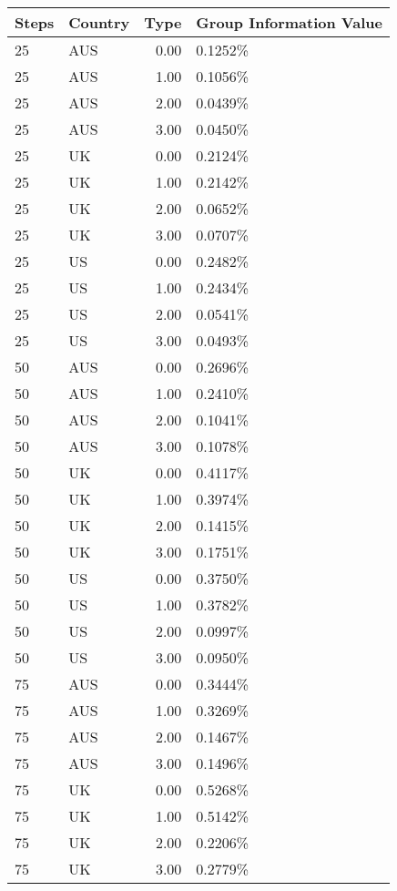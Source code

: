 \begin{table}[ht]
\centering
\begin{tabular}{llrl}
  \hline
Steps & Country & Type & Group Information Value \\ 
  \hline
25 & AUS & 0.00 & 0.1252\% \\ 
  25 & AUS & 1.00 & 0.1056\% \\ 
  25 & AUS & 2.00 & 0.0439\% \\ 
  25 & AUS & 3.00 & 0.0450\% \\ 
  25 & UK & 0.00 & 0.2124\% \\ 
  25 & UK & 1.00 & 0.2142\% \\ 
  25 & UK & 2.00 & 0.0652\% \\ 
  25 & UK & 3.00 & 0.0707\% \\ 
  25 & US & 0.00 & 0.2482\% \\ 
  25 & US & 1.00 & 0.2434\% \\ 
  25 & US & 2.00 & 0.0541\% \\ 
  25 & US & 3.00 & 0.0493\% \\ 
  50 & AUS & 0.00 & 0.2696\% \\ 
  50 & AUS & 1.00 & 0.2410\% \\ 
  50 & AUS & 2.00 & 0.1041\% \\ 
  50 & AUS & 3.00 & 0.1078\% \\ 
  50 & UK & 0.00 & 0.4117\% \\ 
  50 & UK & 1.00 & 0.3974\% \\ 
  50 & UK & 2.00 & 0.1415\% \\ 
  50 & UK & 3.00 & 0.1751\% \\ 
  50 & US & 0.00 & 0.3750\% \\ 
  50 & US & 1.00 & 0.3782\% \\ 
  50 & US & 2.00 & 0.0997\% \\ 
  50 & US & 3.00 & 0.0950\% \\ 
  75 & AUS & 0.00 & 0.3444\% \\ 
  75 & AUS & 1.00 & 0.3269\% \\ 
  75 & AUS & 2.00 & 0.1467\% \\ 
  75 & AUS & 3.00 & 0.1496\% \\ 
  75 & UK & 0.00 & 0.5268\% \\ 
  75 & UK & 1.00 & 0.5142\% \\ 
  75 & UK & 2.00 & 0.2206\% \\ 
  75 & UK & 3.00 & 0.2779\% \\ 

\end{tabular}
\end{table}
